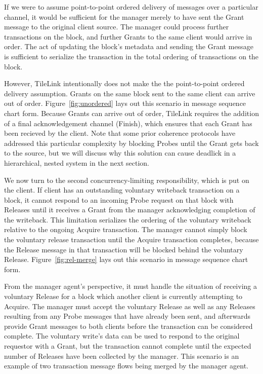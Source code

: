 If we were to assume point-to-point ordered delivery of messages over a particular channel,
it would be sufficient for the manager merely to have sent the Grant message to the original client source.
The manager could process further transactions on the block, and further Grants to the same client would arrive in order.
The act of updating the block's metadata and sending the Grant message is sufficient to serialize the transaction in the total ordering of transactions on the block.

However, TileLink intentionally does not make the the point-to-point ordered delivery assumption.
Grants on the same block sent to the same client can arrive out of order.
Figure~\ref{fig:unordered} lays out this scenario in message sequence chart form.
Because Grants can arrive out of order, TileLink requires the addition of a final acknowledgement channel (Finish), which ensures that each Grant has been recieved by the client.
Note that some prior coherence protocols have addressed this particular complexity by blocking Probes until the Grant gets back to the source, but we will discuss why this solution can
cause deadlick in a hierarchical, nested system in the next section.

We now turn to the second concurrency-limiting responsibility, which is put on the client.
If client has an outstanding voluntary writeback transaction on a block,
it cannot respond to an incoming Probe request on that block with Releases until it receives a Grant from the manager acknowledging completion of the writeback.
This limitation serializes the ordering of the voluntary writeback relative to the ongoing Acquire transaction.
The manager cannot simply block the voluntary release transaction until the Acquire transaction completes, because the Release message in that transaction will be
blocked behind the voluntary Release.
Figure~\ref{fig:rel-merge} lays out this scenario in message sequence chart form.

From the manager agent's perspective, it must handle the situation of receiving a voluntary Release for a block which another client is currently attempting to Acquire.
The manager must accept the voluntary Release as well as any Releases resulting from any Probe messages that have already been sent, and afterwards provide Grant messages to both clients before the transaction can be considered complete.
The voluntary write's data can be used to respond to the original requestor with a Grant, but the transaction cannot complete until the expected number of Releases
have been collected by the manager.
This scenario is an example of two transaction message flows being merged by the manager agent.

